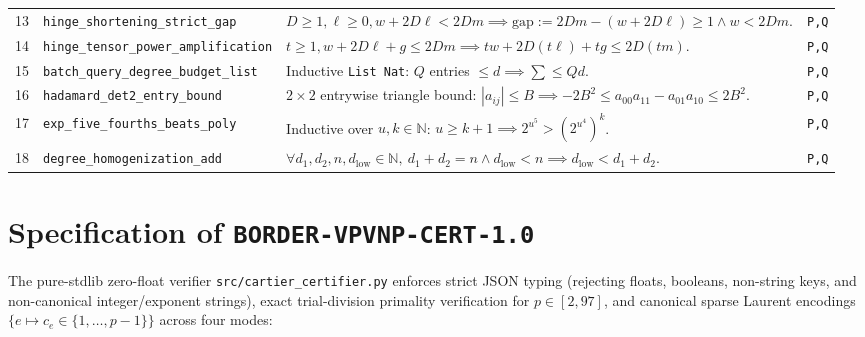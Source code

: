 \documentclass[10pt,twocolumn]{article}
\newcommand{\NN}{\mathbb{N}}
\newcommand{\certschema}{\texttt{BORDER-VPVNP-CERT-1.0}}
\begin{document}
\begin{table}[t]
\begin{tabular}{@{}r l p{10.6cm} l@{}}
13 & \texttt{hinge\_shortening\_strict\_gap} & $D\ge 1,\ell\ge 0, w+2D\ell < 2Dm \implies \mathrm{gap}:=2Dm-(w+2D\ell)\ge 1 \wedge w<2Dm$. & \texttt{P,Q} \\
14 & \texttt{hinge\_tensor\_power\_amplification} & $t\ge 1, w+2D\ell+g\le 2Dm \implies tw+2D(t\ell)+tg\le 2D(tm)$. & \texttt{P,Q} \\
15 & \texttt{batch\_query\_degree\_budget\_list} & Inductive \texttt{List Nat}: $Q$ entries $\le d \implies \sum \le Q d$. & \texttt{P,Q} \\
16 & \texttt{hadamard\_det2\_entry\_bound} & $2\times 2$ entrywise triangle bound: $|a_{ij}|\le B \implies -2B^2 \le a_{00}a_{11}-a_{01}a_{10} \le 2B^2$. & \texttt{P,Q} \\
17 & \texttt{exp\_five\_fourths\_beats\_poly} & Inductive over $u,k\in\NN$: $u \ge k+1 \implies 2^{u^5} > (2^{u^4})^k$. & \texttt{P,Q} \\
18 & \texttt{degree\_homogenization\_add} & $\forall d_1,d_2,n,d_{\mathrm{low}}\in\NN,\ d_1+d_2=n \wedge d_{\mathrm{low}}<n \implies d_{\mathrm{low}}<d_1+d_2$. & \texttt{P,Q} \\
\bottomrule
\end{tabular}
\end{table}

\section{Specification of \texorpdfstring{\certschema{}}{BORDER-VPVNP-CERT-1.0}}\label{sec:cert}
The pure-stdlib zero-float verifier \texttt{src/cartier\_certifier.py} enforces strict JSON typing (rejecting floats, booleans, non-string keys, and non-canonical integer/exponent strings), exact trial-division primality verification for $p\in[2,97]$, and canonical sparse Laurent encodings $\{e\mapsto c_e \in\{1,\dots,p-1\}\}$ across four modes:
\end{document}
